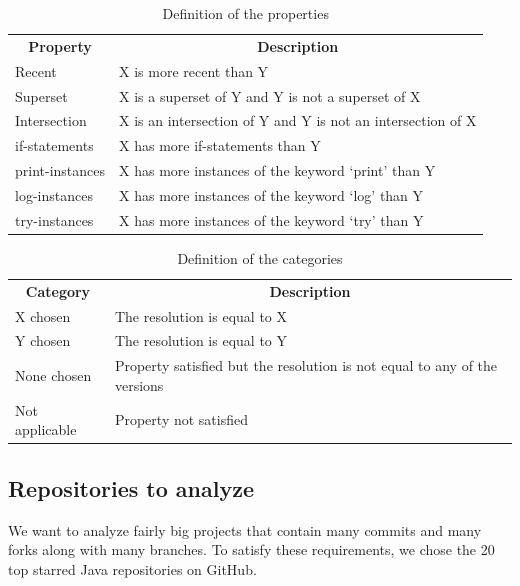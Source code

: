 \FloatBarrier
\begin{table}
\caption{Definition of the properties}\label{table:propdef}
\begin{tabular}{ l l }
\hline
\multicolumn{1}{c}{\textbf{Property}} & \multicolumn{1}{c}{\textbf{Description}}\\
Recent & X is more recent than Y\\
Superset & X is a superset of Y and Y is not a superset of X\\
Intersection & X is an intersection of Y and Y is not an intersection of X\\
if-statements & X has more if-statements than Y\\
print-instances & X has more instances of the keyword ‘print’ than Y\\
log-instances & X has more instances of the keyword ‘log’ than Y\\
try-instances & X has more instances of the keyword ‘try’ than Y\\
\end{tabular}
\end{table}
\FloatBarrier
\begin{table}
\caption{Definition of the categories}\label{table:pproperties2}
\begin{tabular}{ l l }
\hline
\multicolumn{1}{c}{\textbf{Category}} & \multicolumn{1}{c}{\textbf{Description}}\\
X chosen & The resolution is equal to X\\
Y chosen & The resolution is equal to Y\\
None chosen & Property satisfied but the resolution is not equal to any of the versions\\
Not applicable & Property not satisfied\\
\end{tabular}
\end{table}

\FloatBarrier
\subsection{Repositories to analyze}
We want to analyze fairly big projects that contain many commits and many forks along with many branches. To satisfy these requirements, we chose the 20 top starred Java repositories on GitHub.

